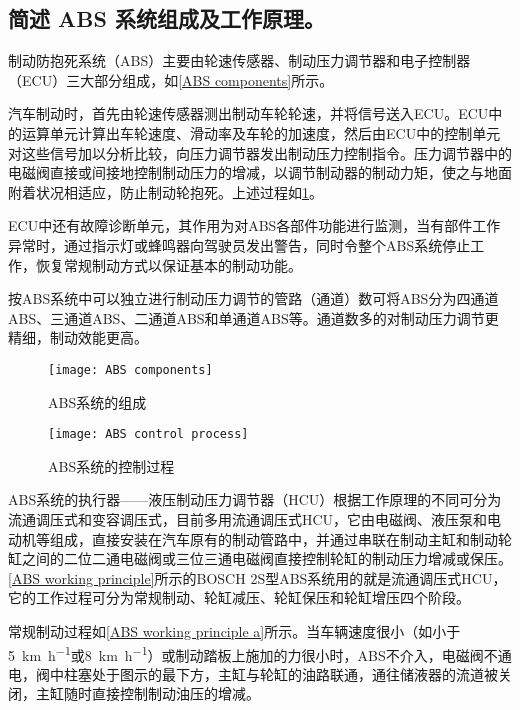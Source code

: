 \documentclass[UTF8]{ctexart}
\numberwithin{figure}{section}
\numberwithin{table}{section}
\begin{document}
\subsection{简述 ABS 系统组成及工作原理。}

制动防抱死系统（ABS）主要由轮速传感器、制动压力调节器和电子控制器（ECU）三大部分组成，如\cref{ABS components}所示。

汽车制动时，首先由轮速传感器测出制动车轮轮速，并将信号送入ECU。ECU中的运算单元计算出车轮速度、滑动率及车轮的加速度，然后由ECU中的控制单元对这些信号加以分析比较，向压力调节器发出制动压力控制指令。压力调节器中的电磁阀直接或间接地控制制动压力的增减，以调节制动器的制动力矩，使之与地面附着状况相适应，防止制动轮抱死。上述过程如\cref{ABS control process}。

ECU中还有故障诊断单元，其作用为对ABS各部件功能进行监测，当有部件工作异常时，通过指示灯或蜂鸣器向驾驶员发出警告，同时令整个ABS系统停止工作，恢复常规制动方式以保证基本的制动功能。

按ABS系统中可以独立进行制动压力调节的管路（通道）数可将ABS分为四通道ABS、三通道ABS、二通道ABS和单通道ABS等。通道数多的对制动压力调节更精细，制动效能更高。

\begin{figure}[htbp]
	\centering
	\begin{minipage}[b]{0.8\textwidth}
		\centering
		\texttt{[image: ABS components]}
		\caption{ABS系统的组成}
		\label{ABS components}
	\end{minipage}
	\begin{minipage}[b]{0.8\textwidth}
		\centering
		\texttt{[image: ABS control process]}
		\caption{ABS系统的控制过程}
		\label{ABS control process}
	\end{minipage}
\end{figure}

ABS系统的执行器——液压制动压力调节器（HCU）根据工作原理的不同可分为流通调压式和变容调压式，目前多用流通调压式HCU，它由电磁阀、液压泵和电动机等组成，直接安装在汽车原有的制动管路中，并通过串联在制动主缸和制动轮缸之间的二位二通电磁阀或三位三通电磁阀直接控制轮缸的制动压力增减或保压。\cref{ABS working principle}所示的BOSCH 2S型ABS系统用的就是流通调压式HCU，它的工作过程可分为常规制动、轮缸减压、轮缸保压和轮缸增压四个阶段。

常规制动过程如\cref{ABS working principle a}所示。当车辆速度很小（如小于\SI[per-mode = symbol]{5}{\km\per\hour}或\SI[per-mode = symbol]{8}{\km\per\hour}）或制动踏板上施加的力很小时，ABS不介入，电磁阀不通电，阀中柱塞处于图示的最下方，主缸与轮缸的油路联通，通往储液器的流道被关闭，主缸随时直接控制制动油压的增减。
\end{document}
